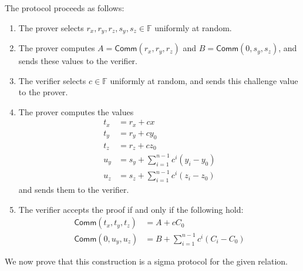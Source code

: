 \documentclass{article}
\newcommand{\F}{\mathbb{F}}
\newcommand{\func}[1]{\mathsf{#1}}
\newcommand{\comm}{\func{Comm}}
\begin{document}
The protocol proceeds as follows:
\begin{enumerate}
    \item The prover selects $r_x, r_y, r_z, s_y, s_z \in \F$ uniformly at random.
    \item The prover computes $A = \comm(r_x, r_y, r_z)$ and $B = \comm(0, s_y, s_z)$, and sends these values to the verifier.
    \item The verifier selects $c \in \F$ uniformly at random, and sends this challenge value to the prover.
    \item The prover computes the values
    \begin{align*}
        t_x &= r_x + cx \\
        t_y &= r_y + cy_0 \\
        t_z &= r_z + cz_0 \\
        u_y &= s_y + \sum_{i=1}^{n-1} c^i(y_i - y_0) \\
        u_z &= s_z + \sum_{i=1}^{n-1} c^i(z_i - z_0)
    \end{align*}
    and sends them to the verifier.
    \item The verifier accepts the proof if and only if the following hold:
    \begin{align}
        \comm(t_x, t_y, t_z) &= A + cC_0 \label{eqn:type-1} \\
        \comm(0, u_y, u_z) &= B + \sum_{i=1}^{n-1} c^i(C_i - C_0) \label{eqn:type-2}
    \end{align}
\end{enumerate}

We now prove that this construction is a sigma protocol for the given relation.
\end{document}
